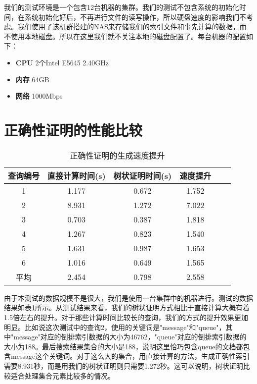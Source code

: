 我们的测试环境是一个包含12台机器的集群。我们的测试不包含系统的初始化时间，在系统初始化好后，不再进行文件的读写操作，所以硬盘速度的影响我们不考虑。我们使用了该机群搭建的NAS来存储我们的索引文件和事先计算的数据，而不使用本地磁盘。所以在这里我们就不关注本地的磁盘配置了。每台机器的配置如下：

\begin{itemize}
    \item \textbf{CPU} 2个Intel E5645 2.40GHz
    \item \textbf{内存} 64GB
    \item \textbf{网络} 1000Mbps
\end{itemize}

\section {正确性证明的性能比较}
\begin{table}[htb]
    \centering
    \caption{正确性证明的生成速度提升}
    \begin{tabular}{cccccc}
        \toprule
        查询编号 & 直接计算时间(s) & 树状证明时间(s) & 速度提升 \\
        \midrule
        1 & 1.177 & 0.672 & 1.752  \\
        2 & 8.931 & 1.272 & 7.022  \\
        3 & 0.703 & 0.387 & 1.818  \\
        4 & 1.267 & 0.823 & 1.540  \\
        5 & 1.631 & 0.987 & 1.653  \\
        6 & 1.016 & 0.649 & 1.565  \\
        \midrule
        平均 & 2.454 & 0.798 & 2.558  \\
        \bottomrule
    \end{tabular}
    \label{tab:correctness_speedup}
\end{table}

由于本测试的数据规模不是很大，我们是使用一台集群中的机器进行。测试的数据结果如表\ref{tab:correctness_speedup}所示。从测试结果来看，我们的树状证明方式相比于直接计算大概有着1.5倍左右的提升。对于那些计算时间比较长的查询，我们的方式的提升效果更加明显。比如说这次测试中的查询2，使用的关键词是"message"和"queue"，其中"message"对应的倒排索引数据的大小为46762，"queue"对应的倒排索引数据的大小为188。最后搜索结果集合的大小是188，说明这里恰巧包含queue的文档都包含message这个关键词。对于这么大的集合，用直接计算的方法，生成正确性索引需要8.931秒，而是用我们的树状证明则只需要1.272秒。这可以说明，树状证明比较适合处理集合元素比较多的情况。


